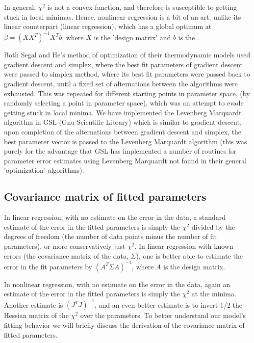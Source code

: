In general, $\chi^2$ is not a convex function, and therefore is susceptible to getting stuck in local minimas.  Hence, nonlinear regression is a bit of an art\cite{press_etal:1996}, unlike its linear counterpart (linear regression), which has a global optimum at $\beta=(XX^T)^{-1}X^Tb$, where $X$ is the 'design matrix' and $b$ is the .

Both Segal and He's method of optimization of their thermodynamic models used gradient descent and simplex, where the best fit parameters of gradient descent were passed to simplex method, where its best fit parameters were passed back to gradient descent, until a fixed set of alternations between the algorithms were exhausted.  This was repeated for different starting points in parameter space, (by randomly selecting a point in parameter space), which was an attempt to evade getting stuck in local minima.  We have implemented the Levenberg Marquardt algorithm in GSL (Gnu Scientific Library) which is similar to gradient descent, upon completion of the alternations between gradient descent and simplex, the best parameter vector is passed to the Levenberg Marquardt algorithm (this was purely for the advantage that GSL has implemented a number of routines for parameter error estimates using Levenberg Marquardt not found in their general 'optimization' algorithms).

\subsection{Covariance matrix of fitted parameters}
In linear regression, with no estimate on the error in the data, a standard estimate of the error in the fitted parameters is simply the $\chi^2$ divided by the degrees of freedom (the number of data points minus the number of fit parameters), or more conservatively just $\chi^2$.  In linear regression with known errors (the covariance matrix of the data, $\Sigma$), one is better able to estimate the error in the fit parameters by $(A^T\Sigma A)^{-1}$, where $A$ is the design matrix.

In nonlinear regression, with no estimate on the error in the data, again an estimate of the error in the fitted parameters is simply the $\chi^2$ at the minima.  Another estimate is $(J^TJ)^{-1}$, and an even better estimate is to invert 1/2 the Hessian matrix of the $\chi^2$ over the parameters.  To better understand our model's fitting behavior we will briefly discuss the derivation of the covariance matrix of fitted parameters.

